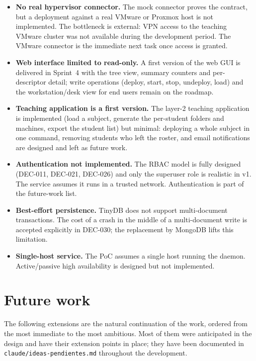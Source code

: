 \begin{itemize}
  \item \textbf{No real hypervisor connector.} The mock connector
        proves the contract, but a deployment against a real VMware
        or Proxmox host is not implemented. The bottleneck is
        external: VPN access to the teaching VMware cluster was
        not available during the development period. The VMware
        connector is the immediate next task once access is
        granted.
  \item \textbf{Web interface limited to read-only.} A first
        version of the web GUI is delivered in Sprint~4 with the
        tree view, summary counters and per-descriptor detail; write
        operations (deploy, start, stop, undeploy, load) and the
        workstation/desk view for end users remain on the roadmap.
  \item \textbf{Teaching application is a first version.} The
        layer-2 teaching application is implemented (load a subject,
        generate the per-student folders and machines, export the
        student list) but minimal: deploying a whole subject in one
        command, removing students who left the roster, and email
        notifications are designed and left as future work.
  \item \textbf{Authentication not implemented.} The RBAC model is
        fully designed (DEC-011, DEC-021, DEC-026) and only the
        superuser role is realistic in v1. The service assumes it
        runs in a trusted network. Authentication is part of the
        future-work list.
  \item \textbf{Best-effort persistence.} TinyDB does not support
        multi-document transactions. The cost of a crash in the
        middle of a multi-document write is accepted explicitly in
        DEC-030; the replacement by MongoDB lifts this limitation.
  \item \textbf{Single-host service.} The PoC assumes a single
        host running the daemon. Active/passive high availability
        is designed but not implemented.
\end{itemize}

\section{Future work}
\label{sec:futuro}

The following extensions are the natural continuation of the work,
ordered from the most immediate to the most ambitious. Most of them
were anticipated in the design and have their extension points in
place; they have been documented in
\texttt{claude/ideas-pendientes.md} throughout the development.

